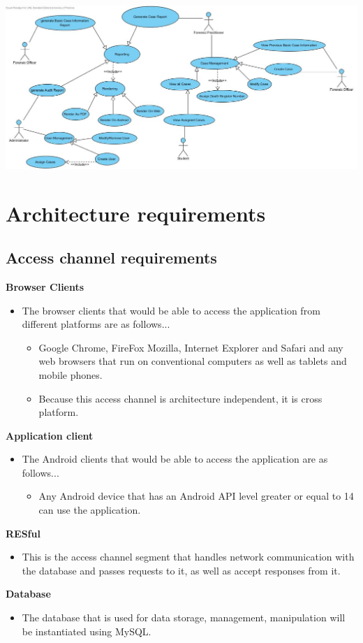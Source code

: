 \documentclass[10pt,a4paper]{article}
\begin{document}
\begin{center}
\includegraphics[scale=0.5]{DRUC.jpg}
\end{center}

\pagebreak
\section{Architecture requirements}
\subsection{Access channel requirements}
\indent\indent \textbf{Browser Clients}
\begin{itemize}
\item The browser clients that would be able to access the application from different platforms are as follows...
\begin{itemize}
\item Google Chrome, FireFox Mozilla, Internet Explorer and Safari and any web browsers that run on conventional computers as well as tablets and mobile phones.
\item Because this access channel is architecture independent, it is cross platform.                                                               
\end{itemize}
\end{itemize}
\indent\indent \textbf{Application client}
\begin{itemize}
\item The Android clients that would be able to access the application are as follows...
\begin{itemize}
\item Any Android device that has an Android API level greater or equal to 14 can use the application.
\end{itemize}
\end{itemize}                                
\indent\indent \textbf{RESful}
\begin{itemize}
\item This is the access channel segment that handles network communication with the database and passes requests to it, as well as accept responses from it.
\end{itemize}                                                                
\indent\indent\textbf{Database}
\begin{itemize}
\item The database that is used for data storage, management, manipulation will be instantiated using MySQL.
\end{itemize}                                                                                                
\end{document}
